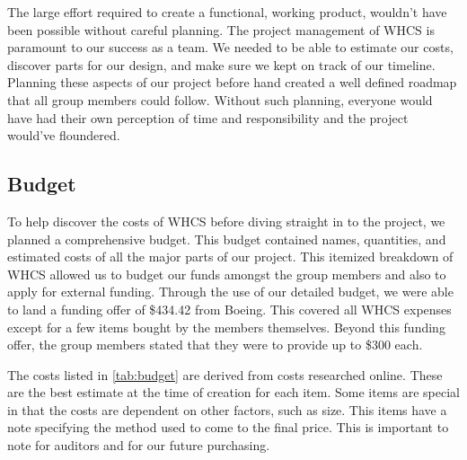 The large effort required to create a functional, working product, wouldn't
have been possible without careful planning. The project management of WHCS is
paramount to our success as a team. We needed to be able to estimate our costs,
discover parts for our design, and make sure we kept on track of our timeline.
Planning these aspects of our project before hand created a well defined
roadmap that all group members could follow. Without such planning, everyone
would have had their own perception of time and responsibility and the project
would've floundered.

\subsection{Budget}
To help discover the costs of WHCS before diving straight in to the project, we
planned a comprehensive budget. This budget contained names, quantities, and
estimated costs of all the major parts of our project. This itemized breakdown
of WHCS allowed us to budget our funds amongst the group members and also to
apply for external funding. Through the use of our detailed budget, we were
able to land a funding offer of \$434.42 from Boeing. This covered
all WHCS expenses except for a few items bought by the members themselves.
Beyond this funding offer, the group members stated that they
were to provide up to \$300 each.

The costs listed in \autoref{tab:budget} are derived from costs researched
online. These are the best estimate at the time of creation for each item. Some
items are special in that the costs are dependent on other factors, such as
size. This items have a note specifying the method used to come to the final
price. This is important to note for auditors and for our future purchasing.

